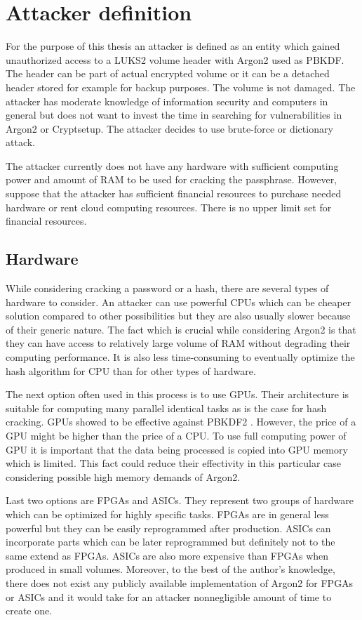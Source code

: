 \documentclass[nolof]{fithesis3}
\begin{document}
\section{Attacker definition}
\label{sec:attacker}
For the purpose of this thesis an attacker is defined as an entity which gained unauthorized access to a LUKS2 volume header with Argon2 used as PBKDF. The header can be part of actual encrypted volume or it can be a detached header stored for example for backup purposes. The volume is not damaged. The attacker has moderate knowledge of information security and computers in general but does not want to invest the time in searching for vulnerabilities in Argon2 or Cryptsetup. The attacker decides to use brute-force or dictionary attack.

The attacker currently does not have any hardware with sufficient computing power and amount of RAM to be used for cracking the passphrase. However, suppose that the attacker has sufficient financial resources to purchase needed hardware or rent cloud computing resources. There is no upper limit set for financial resources.

\subsection{Hardware}
While considering cracking a password or a hash, there are several types of hardware to consider. An attacker can use powerful CPUs which can be cheaper solution compared to other possibilities but they are also usually slower because of their generic nature. The fact which is crucial while considering Argon2 is that they can have access to relatively large volume of RAM without degrading their computing performance. It is also less time-consuming to eventually optimize the hash algorithm for CPU than for other types of hardware.

The next option often used in this process is to use GPUs. Their architecture is suitable for computing many parallel identical tasks as is the case for hash cracking. GPUs showed to be effective against PBKDF2 \parencite{mosnacek}. However, the price of a GPU might be higher than the price of a CPU. To use full computing power of GPU it is important that the data being processed is copied into GPU memory which is limited. This fact could  reduce their effectivity in this particular case considering possible high memory demands of Argon2.

Last two options are FPGAs and ASICs. They represent two groups of hardware which can be optimized for highly specific tasks. FPGAs are in general less powerful but they can be easily reprogrammed after production. ASICs can incorporate parts which can be later reprogrammed but definitely not to the same extend as FPGAs. ASICs are also more expensive than FPGAs when produced in small volumes. Moreover, to the best of the author's knowledge, there does not exist any publicly available implementation of Argon2 for FPGAs or ASICs and it would take for an attacker nonnegligible amount of time to create one.
\end{document}
